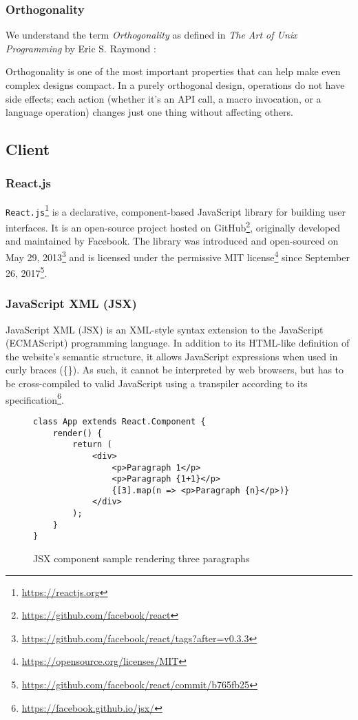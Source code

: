 \subsubsection{Orthogonality}
We understand the term \textit{Orthogonality} as defined in \textit{The Art of Unix Programming} by Eric S. Raymond \cite{raymond2003compactness}:
\begin{definition}
    Orthogonality is one of the most important properties that can help make even complex designs compact. In a purely orthogonal design, operations do not have side effects; each action (whether it's an API call, a macro invocation, or a language operation) changes just one thing without affecting others.
\end{definition}

\subsection{Client}
\subsubsection{React.js}
\texttt{React.js}\footnote{\url{https://reactjs.org}} is a declarative, component-based JavaScript library for building user interfaces. 
It is an open-source project hosted on GitHub\footnote{\url{https://github.com/facebook/react}}, originally developed and maintained by Facebook.
The library was introduced and open-sourced on May 29, 2013\footnote{\url{https://github.com/facebook/react/tags?after=v0.3.3}} and is licensed under the permissive MIT license\footnote{\url{https://opensource.org/licenses/MIT}} since September 26, 2017\footnote{\url{https://github.com/facebook/react/commit/b765fb25}}.

\subsubsection{JavaScript XML (JSX)}
JavaScript XML (JSX) is an XML-style syntax extension to the JavaScript (ECMAScript) programming language.
In addition to its HTML-like definition of the website's semantic structure, it allows JavaScript expressions when used in curly braces (\{\}).
As such, it cannot be interpreted by web browsers, but has to be cross-compiled to valid JavaScript using a transpiler according to its specification\footnote{\url{https://facebook.github.io/jsx/}}.


\begin{figure}[H]
\begin{verbatim}
class App extends React.Component {
    render() {
        return (
            <div>
                <p>Paragraph 1</p>
                <p>Paragraph {1+1}</p>
                {[3].map(n => <p>Paragraph {n}</p>)}
            </div>
        );
    }
}
\end{verbatim}
\caption{JSX component sample rendering three paragraphs}
\end{figure}


